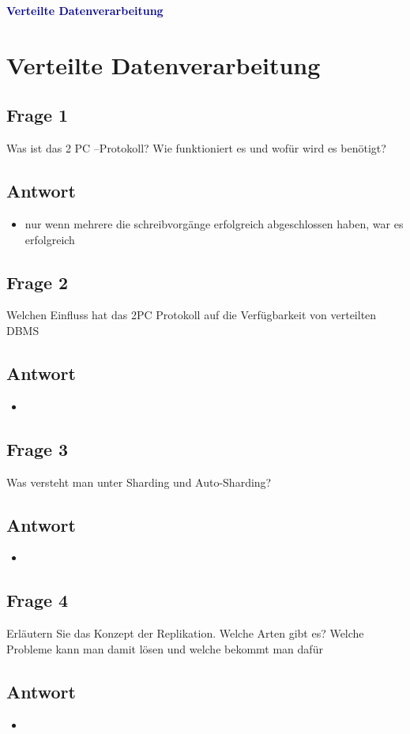 \textbf{\textcolor{darkblue}{ Verteilte Datenverarbeitung}}~

\section*{Verteilte Datenverarbeitung}
\subsection*{Frage 1}
Was ist das 2 PC –Protokoll? Wie funktioniert es und wofür wird es benötigt?
\subsection*{Antwort}
\begin{itemize}
	\item  nur wenn mehrere die schreibvorgänge erfolgreich abgeschlossen haben, war es erfolgreich
\end{itemize}

\subsection*{Frage 2}
Welchen Einfluss hat das 2PC Protokoll auf die Verfügbarkeit von verteilten DBMS
\subsection*{Antwort}
\begin{itemize}
	\item 
\end{itemize}

\subsection*{Frage 3}
Was versteht man unter Sharding und Auto-Sharding?
\subsection*{Antwort}
\begin{itemize}
	\item 
\end{itemize}
\subsection*{Frage 4}
Erläutern Sie das Konzept der Replikation. Welche Arten gibt es? Welche Probleme kann man damit lösen und welche bekommt man dafür
\subsection*{Antwort}
\begin{itemize}
	\item 
\end{itemize}
